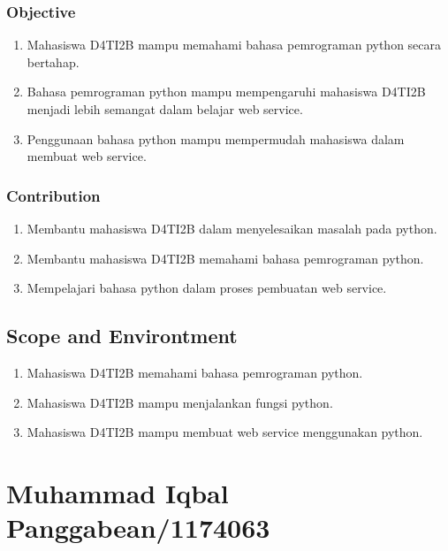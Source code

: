 \subsubsection{Objective}
\begin{enumerate}
	\item Mahasiswa D4TI2B mampu memahami bahasa pemrograman python secara bertahap.
	\item Bahasa pemrograman python mampu mempengaruhi mahasiswa D4TI2B menjadi lebih semangat dalam belajar web service.
	\item Penggunaan bahasa python mampu mempermudah mahasiswa dalam membuat web service.
\end{enumerate}
\subsubsection{Contribution}
\begin{enumerate}
	\item Membantu mahasiswa D4TI2B dalam menyelesaikan masalah pada python.
	\item Membantu mahasiswa D4TI2B memahami bahasa pemrograman python.
	\item Mempelajari bahasa python dalam proses pembuatan web service.
\end{enumerate}
		
\subsection{Scope and Environtment}
\begin{enumerate}
	\item Mahasiswa D4TI2B memahami bahasa pemrograman python.
	\item Mahasiswa D4TI2B mampu menjalankan fungsi python.
	\item Mahasiswa D4TI2B mampu membuat web service menggunakan python.
\end{enumerate}

\section{Muhammad Iqbal Panggabean/1174063}
